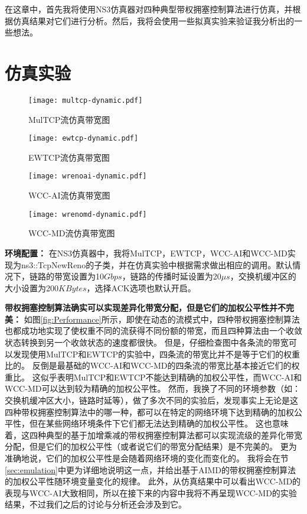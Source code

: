 \documentclass[winfonts]{njuthesis}
\begin{document}
在这章中，首先我将使用NS3仿真器\cite{NS3}对四种典型带权拥塞控制算法进行仿真，并根据仿真结果对它们进行分析。然后，我将会使用一些拟真实验来验证我分析出的一些想法。

\section{仿真实验}
\label{sec:simulation}

\begin{figure}[h]
  \centering
  \texttt{[image: multcp-dynamic.pdf]}
  \caption{MulTCP流仿真带宽图}
  \label{fig:MulTCPPerformance}
\end{figure}
\begin{figure}[h]
  \centering
  \texttt{[image: ewtcp-dynamic.pdf]}
  \caption{EWTCP流仿真带宽图}
  \label{fig:EWTCPPerformance}
\end{figure}
\begin{figure}[h]
  \centering
  \texttt{[image: wrenoai-dynamic.pdf]}
  \caption{WCC-AI流仿真带宽图}
  \label{fig:WReno-AIPerformance}
\end{figure}
\begin{figure}[h]
  \centering
  \texttt{[image: wrenomd-dynamic.pdf]}
  \caption{WCC-MD流仿真带宽图}
  \label{fig:WReno-MDPerformance}
\end{figure}

\textbf{环境配置：}
在NS3仿真器中，我将MulTCP，EWTCP，WCC-AI和WCC-MD实现为ns3::TcpNewReno的子类，并在仿真实验中根据需求做出相应的调用。默认情况下，链路的带宽设置为10$Gbps$，链路的传播时延设置为20$\mu s$，交换机缓冲区的大小设置为200$KBytes$，选择ACK选项也默认开启。

\textbf{带权拥塞控制算法确实可以实现差异化带宽分配，但是它们的加权公平性并不完美：}
如图\ref{fig:Performance}所示，即使在动态的流模式中，四种带权拥塞控制算法也都成功地实现了使权重不同的流获得不同份额的带宽，而且四种算法由一个收敛状态转换到另一个收敛状态的速度都很快。
但是，仔细检查图中各条流的带宽可以发现使用MulTCP和EWTCP的实验中，四条流的带宽比并不是等于它们的权重比的。
反倒是最基础的WCC-AI和WCC-MD的四条流的带宽比基本接近它们的权重比。
这似乎表明MulTCP和EWTCP不能达到精确的加权公平性，而WCC-AI和WCC-MD可以达到较为精确的加权公平性。
然而，我换了不同的环境参数（如：交换机缓冲区大小，链路时延等），做了多次不同的实验后，发现事实上无论是这四种带权拥塞控制算法中的哪一种，都可以在特定的网络环境下达到精确的加权公平性，但在某些网络环境条件下它们都无法达到精确的加权公平性。
这也意味着，这四种典型的基于加增乘减的带权拥塞控制算法都可以实现流级的差异化带宽分配，但是它们的加权公平性（或者说它们的带宽分配结果）是不完美的。
更为准确地说，它们的加权公平性是会随着网络环境的变化而变化的。
我将会在节\ref{sec:emulation}中更为详细地说明这一点，并给出基于AIMD的带权拥塞控制算法的加权公平性随环境变量变化的规律。
此外，从仿真结果中可以看出WCC-MD的表现与WCC-AI大致相同，所以在接下来的内容中我将不再呈现WCC-MD的实验结果，不过我们之后的讨论与分析还会涉及到它。
\end{document}
